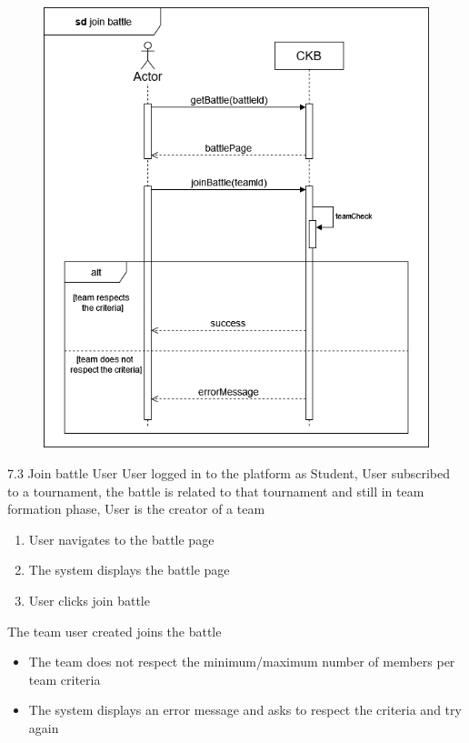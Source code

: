 \usecase
{
    \begin{figure}[H]
        \centering
        \includegraphics[width=\textwidth]{src/sequence_diagrams/joinbattle.png}
    \end{figure}
}
{7.3}
{Join battle} %
{User} %
{User logged in to the platform as Student, User subscribed to a tournament, the battle is related to that tournament and still in team formation phase, User is the creator of a team} %
{ %
    \begin{enumerate}
        \item User navigates to the battle page
        \item The system displays the battle page
        \item User clicks join battle
    \end{enumerate}
}
{The team user created joins the battle} %
{ %
    \begin{itemize}
        \item The team does not respect the minimum/maximum number of members per team criteria
    \end{itemize}
}
{ %
    \begin{itemize}
        \item The system displays an error message and asks to respect the criteria and try again
    \end{itemize}
}


